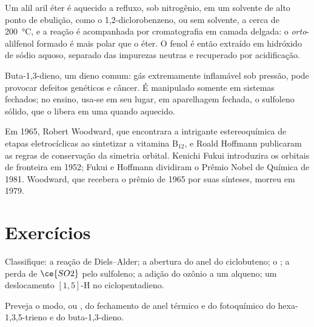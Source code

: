\begin{inthelab}
Um alil aril éter é aquecido a refluxo, sob nitrogênio, em um solvente de alto ponto de
ebulição, como o 1,2-diclorobenzeno, ou sem solvente, a cerca de \qty{200}{\celsius}, e
a reação é acompanhada por cromatografia em camada delgada: o \textit{orto}-alilfenol formado
é mais polar que o éter. O fenol é então extraído em hidróxido de sódio
aquoso, separado das impurezas neutras e recuperado por acidificação.
\end{inthelab}

\begin{safety}{}
Buta-1,3-dieno, um dieno comum: gás extremamente inflamável sob pressão, pode provocar
defeitos genéticos e câncer. É manipulado somente em sistemas fechados; no ensino,
usa-se em seu lugar, em aparelhagem fechada, o sulfoleno sólido, que o libera em uma 
quando aquecido.
\end{safety}

\begin{history}
Em 1965, Robert Woodward, que encontrara a intrigante estereoquímica de
etapas eletrocíclicas ao sintetizar a vitamina B$_{12}$, e Roald Hoffmann publicaram
as regras de conservação da simetria orbital. Kenichi Fukui introduzira os
orbitais de fronteira em 1952; Fukui e Hoffmann dividiram o Prêmio Nobel de
Química de 1981. Woodward, que recebera o prêmio de 1965 por suas sínteses, morreu em
1979.
\end{history}

\section{Exercícios}

\begin{exercise}[$\star$]\label{exo:b3:pericyclic:1}
Classifique: a reação de Diels--Alder; a abertura do anel do ciclobuteno; o ; a perda de $\ce{SO2}$ pelo sulfoleno; a adição do ozônio a um alqueno;
um deslocamento $[1,5]$-H no ciclopentadieno.
\end{exercise}

\begin{exercise}[$\star$]\label{exo:b3:pericyclic:2}
Preveja o modo,  ou , do fechamento de anel térmico e do
fotoquímico do hexa-1,3,5-trieno e do buta-1,3-dieno.
\end{exercise}

